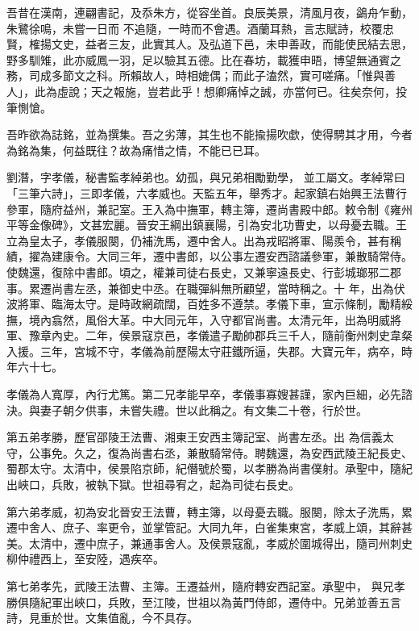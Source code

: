 \begin{pinyinscope}
 吾昔在漢南，連翩書記，及忝朱方，從容坐首。良辰美景，清風月夜，鷁舟乍動，朱鷺徐鳴，未嘗一日而
 不追隨，一時而不會遇。酒蘭耳熱，言志賦詩，校覆忠賢，榷揚文史，益者三友，此實其人。及弘道下邑，未申善政，而能使民結去思，野多馴雉，此亦威鳳一羽，足以驗其五德。比在春坊，載獲申晤，博望無通賓之務，司成多節文之科。所賴故人，時相媲偶；而此子溘然，實可嗟痛。「惟與善人」，此為虛說；天之報施，豈若此乎！想卿痛悼之誠，亦當何已。往矣奈何，投筆惻愴。



 吾昨欲為誌銘，並為撰集。吾之劣薄，其生也不能揄揚吹歔，使得騁其才用，今者為銘為集，何益既往？故為痛惜之情，不能已已耳。



 劉潛，字孝儀，秘書監孝綽弟也。幼孤，與兄弟相勵勤學，
 並工屬文。孝綽常曰「三筆六詩」，三即孝儀，六孝威也。天監五年，舉秀才。起家鎮右始興王法曹行參軍，隨府益州，兼記室。王入為中撫軍，轉主簿，遷尚書殿中郎。敕令制《雍州平等金像碑》，文甚宏麗。晉安王綱出鎮襄陽，引為安北功曹史，以母憂去職。王立為皇太子，孝儀服闋，仍補洗馬，遷中舍人。出為戎昭將軍、陽羨令，甚有稱績，擢為建康令。大同三年，遷中書郎，以公事左遷安西諮議參軍，兼散騎常侍。使魏還，復除中書郎。頃之，權兼司徒右長史，又兼寧遠長史、行彭城瑯邪二郡事。累遷尚書左丞，兼御史中丞。在職彈糾無所顧望，當時稱之。十
 年，出為伏波將軍、臨海太守。是時政網疏闊，百姓多不遵禁。孝儀下車，宣示條制，勵精綏撫，境內翕然，風俗大革。中大同元年，入守都官尚書。太清元年，出為明威將軍、豫章內史。二年，侯景寇京邑，孝儀遣子勵帥郡兵三千人，隨前衡州刺史韋粲入援。三年，宮城不守，孝儀為前歷陽太守莊鐵所逼，失郡。大寶元年，病卒，時年六十七。



 孝儀為人寬厚，內行尤篤。第二兄孝能早卒，孝儀事寡嫂甚謹，家內巨細，必先諮決。與妻子朝夕供事，未嘗失禮。世以此稱之。有文集二十卷，行於世。



 第五弟孝勝，歷官邵陵王法曹、湘東王安西主簿記室、尚書左丞。出
 為信義太守，公事免。久之，復為尚書右丞，兼散騎常侍。聘魏還，為安西武陵王紀長史、蜀郡太守。太清中，侯景陷京師，紀僭號於蜀，以孝勝為尚書僕射。承聖中，隨紀出峽口，兵敗，被執下獄。世祖尋宥之，起為司徒右長史。



 第六弟孝威，初為安北晉安王法曹，轉主簿，以母憂去職。服闋，除太子洗馬，累遷中舍人、庶子、率更令，並掌管記。大同九年，白雀集東宮，孝威上頌，其辭甚美。太清中，遷中庶子，兼通事舍人。及侯景寇亂，孝威於圍城得出，隨司州刺史柳仲禮西上，至安陸，遇疾卒。



 第七弟孝先，武陵王法曹、主簿。王遷益州，隨府轉安西記室。承聖中，
 與兄孝勝俱隨紀軍出峽口，兵敗，至江陵，世祖以為黃門侍郎，遷侍中。兄弟並善五言詩，見重於世。文集值亂，今不具存。




\end{pinyinscope}
